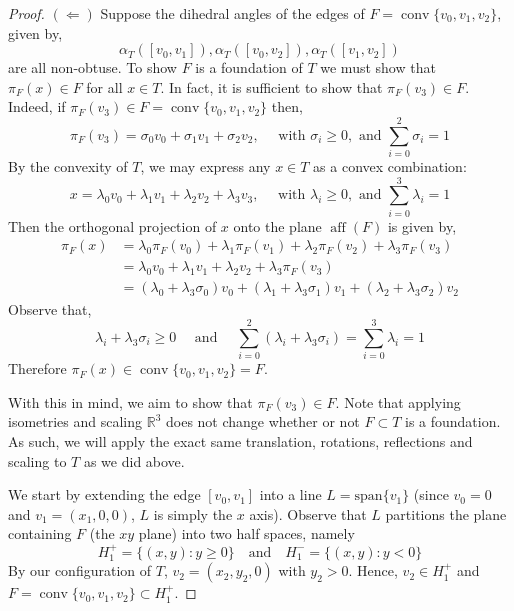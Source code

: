 \documentclass{mainresearch}
\begin{document}
\begin{proof}
	
	$(\Leftarrow)$ Suppose the dihedral angles of the edges of $F=\operatorname{conv}\{v_0,v_1,v_2\}$, given by, 
	\[
	\alpha_T([v_0,v_1]),\alpha_T([v_0,v_2]),\alpha_T([v_1,v_2])
	\]
	are all non-obtuse. To show $F$ is a foundation of $T$ we must show that $\pi_F(x) \in F$ for all $x\in T$. In fact, it is sufficient to show that $\pi_F(v_3)\in F$. Indeed, if $\pi_F(v_3) \in F = \operatorname{conv}\{v_0,v_1,v_2\}$ then, 
	\begin{equation*}
		\pi_F(v_3) = \sigma_0v_0+\sigma_1v_1+\sigma_2v_2 ,  \quad \text{ with } \sigma_i \ge 0 , \text{ and } \sum^2_{i=0} \sigma_i = 1
	\end{equation*}
	By the convexity of $T$, we may express any $x\in T$ as a convex combination:
	\begin{equation*}
		x = \lambda_0v_0+\lambda_1v_1+\lambda_2v_2+\lambda_3v_3 ,  \quad \text{ with } \lambda_i \ge 0 , \text{ and } \sum^3_{i=0} \lambda_i = 1
	\end{equation*}
	Then the orthogonal projection of $x$ onto the plane $\operatorname{aff}(F)$ is given by,
	\begin{align*}
		\pi_F(x) &= \lambda_0\pi_F(v_0)+\lambda_1\pi_F(v_1) +\lambda_2\pi_F(v_2)+\lambda_3 \pi_F(v_3) \\
		&= \lambda_0v_0+\lambda_1v_1+\lambda_2v_2 +\lambda_3 \pi_F(v_3)\\
		&= (\lambda_0 + \lambda_3\sigma_0 )v_0+(\lambda_1+\lambda_3\sigma_1)v_1+(\lambda_2 + \lambda_3\sigma_2) v_2 
	\end{align*}
	Observe that,
	\[
	\lambda_i+\lambda_3\sigma_i \ge 0 \quad \text{ and } \quad \sum_{i=0}^2(\lambda_i+\lambda_3\sigma_i) = \sum_{i=0}^3\lambda_i=1
	\]
	Therefore $\pi_F(x)\in \operatorname{conv}\{v_0,v_1,v_2\} = F$.
	
	With this in mind, we aim to show that $\pi_F(v_3) \in F$. Note that applying isometries and scaling $\mathbb{R}^3$ does not change whether or not $F\subset T$ is a foundation. As such, we will apply the exact same translation, rotations, reflections and scaling to $T$ as we did above.
	
	We start by extending the edge $[v_0,v_1]$ into a line $L=\mathrm{span}\{v_1\}$ (since $v_0 = 0$ and $v_1=(x_1,0,0)$, $L$ is simply the  $x$ axis). Observe that $L$ partitions the plane containing $F$ (the $xy$ plane) into two half spaces, namely
	\begin{equation*}
		H_1^+=\{(x,y):y\geq0\} \quad \text{and} \quad  H_1^-=\{(x,y):y<0\}
	\end{equation*}
	By our configuration of $T$, $v_2 = (x_2,y_2,0)$ with $y_2>0$. Hence, $v_2\in H_1^+$ and $F=\operatorname{conv}\{v_0,v_1,v_2\}\subset H_1^+$. 
	

\end{proof}
\end{document}
